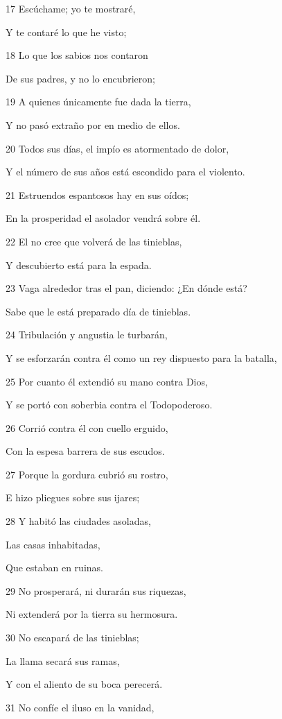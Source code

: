 \par 17 Escúchame; yo te mostraré,
\par Y te contaré lo que he visto;
\par 18 Lo que los sabios nos contaron
\par De sus padres, y no lo encubrieron;
\par 19 A quienes únicamente fue dada la tierra,
\par Y no pasó extraño por en medio de ellos.
\par 20 Todos sus días, el impío es atormentado de dolor,
\par Y el número de sus años está escondido para el violento. 
\par 21 Estruendos espantosos hay en sus oídos;
\par En la prosperidad el asolador vendrá sobre él.
\par 22 El no cree que volverá de las tinieblas,
\par Y descubierto está para la espada.
\par 23 Vaga alrededor tras el pan, diciendo: ¿En dónde está?
\par Sabe que le está preparado día de tinieblas.
\par 24 Tribulación y angustia le turbarán,
\par Y se esforzarán contra él como un rey dispuesto para la batalla,
\par 25 Por cuanto él extendió su mano contra Dios,
\par Y se portó con soberbia contra el Todopoderoso.
\par 26 Corrió contra él con cuello erguido, 
\par Con la espesa barrera de sus escudos.
\par 27 Porque la gordura cubrió su rostro,
\par E hizo pliegues sobre sus ijares;
\par 28 Y habitó las ciudades asoladas,
\par Las casas inhabitadas,
\par Que estaban en ruinas.
\par 29 No prosperará, ni durarán sus riquezas,
\par Ni extenderá por la tierra su hermosura.
\par 30 No escapará de las tinieblas;
\par La llama secará sus ramas,
\par Y con el aliento de su boca perecerá.
\par 31 No confíe el iluso en la vanidad,
